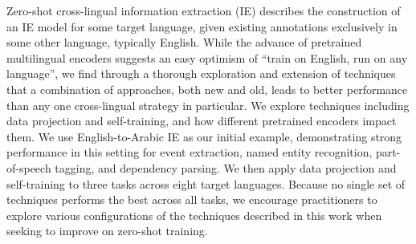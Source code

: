 Zero-shot cross-lingual information extraction (IE) describes the construction of an IE model for some target language, given existing annotations exclusively in some other language, typically English.  While the advance of pretrained multilingual encoders suggests an easy optimism of ``train on English, run on any language'', we find through a thorough exploration and extension of techniques that a combination of approaches, both new and old, leads to better performance than any one cross-lingual strategy in particular. We explore techniques including data projection and self-training, and how different pretrained encoders impact them. We use English-to-Arabic IE as our initial example, demonstrating strong performance in this setting for event extraction, named entity recognition, part-of-speech tagging, and dependency parsing. We then apply data projection and self-training to three tasks across eight target languages. Because no single set of techniques performs the best across all tasks, we encourage practitioners to explore various configurations of the techniques described in this work when seeking to improve on zero-shot training.
